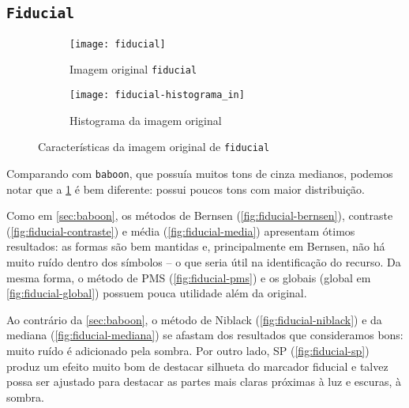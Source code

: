 \documentclass[brazilian,a4paper,twocolumn]{article}
\begin{document}
    \subsection{\texttt{Fiducial}}
    \label{sec:fiducial}

        \begin{figure}[h]
            \centering
            \begin{subfigure}{0.30\textwidth}
                \texttt{[image: fiducial]}
                \caption{Imagem original \texttt{fiducial}}
                \label{fig:fiducial}
            \end{subfigure}
            \begin{subfigure}{0.5\textwidth}
                \texttt{[image: fiducial-histograma\_in]}
                \caption{Histograma da imagem original}
                \label{fig:fiducial-histograma}
            \end{subfigure}

            \caption{Características da imagem original de \texttt{fiducial}}
        \end{figure}

        Comparando com \texttt{baboon}, que possuía muitos tons de cinza medianos, podemos notar que a \cref{fig:fiducial} é bem diferente: possui poucos tons com maior distribuição.

        Como em \ref{sec:baboon}, os métodos de Bernsen (\cref{fig:fiducial-bernsen}), contraste (\cref{fig:fiducial-contraste}) e média (\cref{fig:fiducial-media}) apresentam ótimos resultados: as formas são bem mantidas e, principalmente em Bernsen, não há muito ruído dentro dos símbolos -- o que seria útil na identificação do recurso. Da mesma forma, o método de PMS (\cref{fig:fiducial-pms}) e os globais (global em \cref{fig:fiducial-global}) possuem pouca utilidade além da original.

        Ao contrário da \cref{sec:baboon}, o método de Niblack (\cref{fig:fiducial-niblack}) e da mediana (\cref{fig:fiducial-mediana}) se afastam dos resultados que consideramos bons: muito ruído é adicionado pela sombra. Por outro lado, SP (\cref{fig:fiducial-sp}) produz um efeito muito bom de destacar silhueta do marcador fiducial e talvez possa ser ajustado para destacar as partes mais claras próximas à luz e escuras, à sombra.
\end{document}

